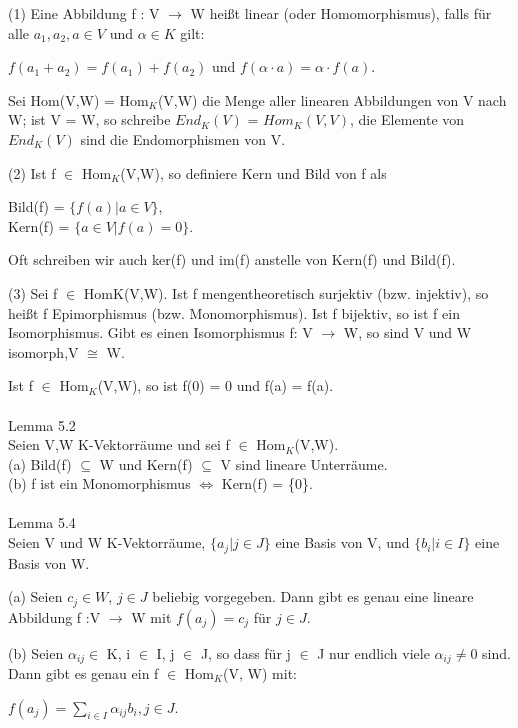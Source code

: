 \begin{compactenum}
\item[(1)] Eine Abbildung f : V $\to$ W heißt linear (oder Homomorphismus), falls für alle $a_1, a_2, a \in V$ und $\alpha \in K$ gilt:
\begin{center}
$f (a_1 + a_2) = f (a_1) + f (a_2)$ und $f (\alpha \cdot a) = \alpha \cdot f (a)$.
\end{center}
Sei Hom(V,W) = Hom$_K$(V,W) die Menge aller linearen Abbildungen von V nach W; ist V = W, so schreibe $End_K(V )$ = $Hom_K(V,V)$, die Elemente von $End_K(V)$ sind die Endomorphismen von V.
\item[(2)] Ist f $\in$ Hom$_K$(V,W), so definiere Kern und Bild von f als
\begin{center}
Bild(f) = $\{ f (a) | a \in V\}$,\\
Kern(f) = $\{ a \in V | f(a) = 0\}$.
\end{center}
Oft schreiben wir auch ker(f) und im(f) anstelle von Kern(f) und Bild(f).
\item[(3)] Sei f $\in$ HomK(V,W). Ist f mengentheoretisch surjektiv (bzw. injektiv), so heißt f Epimorphismus (bzw. Monomorphismus). Ist f bijektiv, so ist f ein Isomorphismus. Gibt es einen Isomorphismus f: V $\to$ W, so sind V und W isomorph,V $\cong$ W.
\end{compactenum}
Ist f $\in$ Hom$_K$(V,W), so ist f(0) = 0 und f(a) = f(a).\\
\\
Lemma 5.2\\
Seien V,W K-Vektorräume und sei f $\in$ Hom$_K$(V,W).\\
(a) Bild(f) $\subseteq$ W und Kern(f) $\subseteq$ V sind lineare Unterräume.\\
(b) f ist ein Monomorphismus $\Leftrightarrow$ Kern(f) = \{0\}.\\
\\
Lemma 5.4\\
Seien V und W K-Vektorräume, $\{a_j | j \in J\}$ eine Basis von V, und $\{b_i | i \in I\}$ eine Basis von W.
\begin{compactenum}
\item[(a)] Seien $c_j \in W$, $j \in J$ beliebig vorgegeben. Dann gibt es genau eine lineare Abbildung f :V $\to$ W mit $f(a_j)=c_j$ für $j \in J$.
\item[(b)]Seien $\alpha_{ij} \in$ K, i $\in$ I, j $\in$ J, so dass für j $\in$ J nur endlich viele $\alpha_{ij} \neq 0$ sind. Dann gibt es genau ein f $\in$ Hom$_K$(V, W) mit:
\begin{center}
$f(a_j) = \sum\nolimits_{i \in I} \alpha_{ij} b_i, j \in J$.
\end{center}
\end{compactenum}
